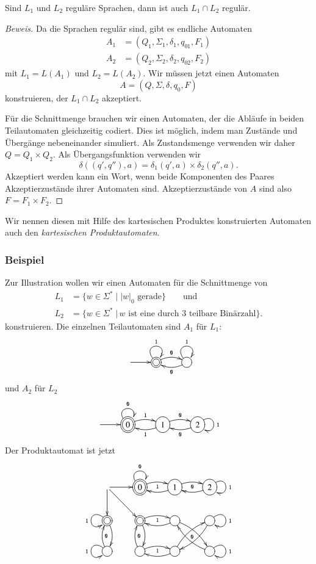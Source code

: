 \begin{satz}
%
\label{satz_intersection}
Sind $L_1$ und $L_2$ reguläre Sprachen, dann
ist auch $L_1\cap L_2$ regulär.
\end{satz}

\begin{proof}[Beweis]
Da die Sprachen regulär sind, gibt es endliche Automaten 
\begin{align*}
A_1&=(Q_1,\Sigma_1,\delta_1, q_{01}, F_1)\\
A_2&=(Q_2,\Sigma_2,\delta_2, q_{02}, F_2)
\end{align*}
mit $L_1=L(A_1)$ und $L_2=L(A_2)$.
Wir müssen jetzt einen Automaten
\[
A = (Q, \Sigma, \delta, q_0, F)
\]
konstruieren, der $L_1\cap L_2$ akzeptiert.

Für die Schnittmenge brauchen wir einen Automaten, der die Abläufe 
in beiden Teilautomaten gleichzeitig codiert.
Dies ist möglich, indem man Zustände und Übergänge nebeneinander
simuliert.
Als Zustandsmenge verwenden wir daher $Q=Q_1\times Q_2$.
Als Übergangsfunktion verwenden wir
\[
\delta((q',q''),a)=\delta_1(q',a)\times \delta_2(q'',a).
\]
Akzeptiert werden kann ein Wort, wenn beide Komponenten des Paares 
Akzeptierzustände ihrer Automaten sind.
Akzeptierzustände von $A$ sind also $F=F_1\times F_2$.
\end{proof}

%
Wir nennen diesen mit Hilfe des kartesischen Produktes konstruierten
Automaten auch den
{\em kartesischen Produktautomaten}\label{reg_produktautomat}.

\subsubsection{Beispiel}
Zur Illustration wollen 
wir einen Automaten für die Schnittmenge von
\begin{align*}
L_1&=\{w\in\Sigma^*\;|\; \text{$|w|_0$ gerade}\}\qquad\text{und}\\
L_2&=\{w\in\Sigma^*\;|\,\text{$w$ ist eine durch 3 teilbare Binärzahl}\}.
\end{align*}
konstruieren.
Die einzelnen Teilautomaten sind $A_1$ für $L_1$:
\[
\entrymodifiers={++[o][F]}
\xymatrix{
*+\txt{}\ar[r]
	&*++[o][F=]{} \ar@/^/[r]^{\tt 0} \ar@(ul,ur)^{\tt 1}
		&{} \ar@/^/[l]^{\tt 0} \ar@(ul,ur)^{\tt 1}
}
\]
und $A_2$ für $L_2$
\[
\entrymodifiers={++[o][F]}
\xymatrix{
*+\txt{}\ar[r]
	&*++[o][F=]{0} \ar@/^/[r]^{\tt 1} \ar@(ul,ur)^{\tt 0}
		&{1} \ar@/^/[l]^{\tt 1} \ar@/^/[r]^{\tt 0}
			&{2}\ar@(ur,dr)^{\tt 1} \ar@/^/[l]^{\tt 0}
}
\]
Der Produktautomat ist jetzt
\[
\entrymodifiers={++[o][F]}
\xymatrix{
*+\txt{} \ar[r] \ar[d] \ar[dr]
	&*++[o][F=]{0} \ar@/^/[r]_{\tt 1} \ar@(ul,ur)^{\tt 0}
		&{1} \ar@/^/[l] \ar@/^/[r]_{\tt 0}
			&{2}\ar@(ur,dr)^{\tt 1} \ar@/^/[l]
\\
*++[o][F=]{} \ar@/^/[d] \ar@(ul,dl)_{\tt 1}
	&*++[o][F=]{} \ar@/^/[d]{\tt 0} \ar@/^/[r]_{\tt 1}
		&{} \ar@/^/[l] \ar@/^/[dr]_{\tt 0}
			&{}\ar@(ur,dr)^{\tt 1} \ar@/^/[dl]
\\
{} \ar@/^/[u]_{\tt 0} \ar@(ul,dl)_{\tt 1}
	&{} \ar@/^/[u]_{\tt 0} \ar@/^/[r]_{\tt 1}
		&{} \ar@/^/[l] \ar@/^/[ur]
			&{}\ar@(ur,dr)^{\tt 1} \ar@/^/[ul]
}
\]

